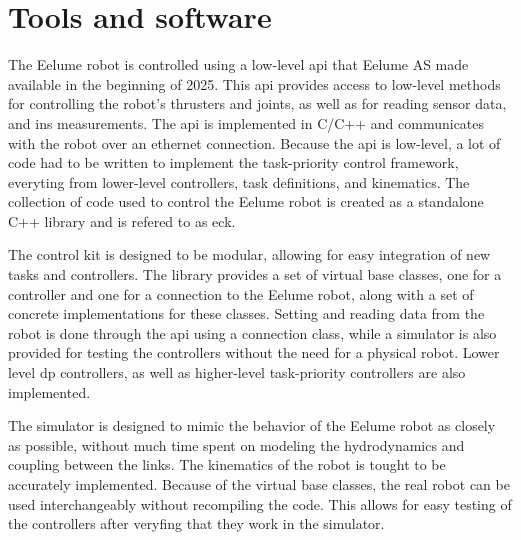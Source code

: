 \section{Tools and software}

The Eelume robot is controlled using a low-level \gls{api} that Eelume AS made
available in the beginning of 2025. This api provides access to low-level methods
for controlling the robot's thrusters and joints, as well as for reading sensor
data, and \gls{ins} measurements. The \gls{api} is implemented in C/C++ and communicates with the robot over
an ethernet connection. Because the \gls{api} is low-level, a lot of code had
to be written to implement the task-priority control framework, everyting from
lower-level controllers, task definitions, and kinematics. The collection of
code used to control the Eelume robot is created as a standalone C++ library
and is refered to as \gls{eck}.

The control kit is designed to be modular, allowing for easy integration of
new tasks and controllers. The library provides a set of virtual base classes,
one for a controller and one for a connection to the Eelume robot, along with
a set of concrete implementations for these classes. Setting and reading data
from the robot is done through the \gls{api} using a connection class, while 
a simulator is also provided for testing the controllers without the need for
a physical robot. Lower level \gls{dp} controllers, as well as higher-level
task-priority controllers are also implemented.

The simulator is designed to mimic the behavior of the Eelume robot as closely
as possible, without much time spent on modeling the hydrodynamics and coupling
between the links. The kinematics of the robot is tought to be accurately
implemented. Because of the virtual base classes, the real robot can be used
interchangeably without recompiling the code. This allows for easy testing of
the controllers after veryfing that they work in the simulator.

